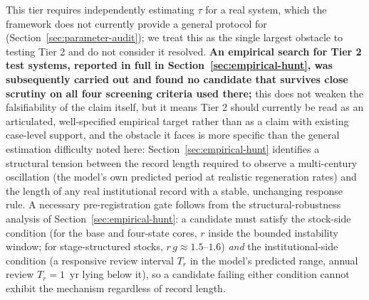 \documentclass[twocolumn,10pt]{article}
\begin{document}
This tier requires independently estimating $\tau$ for a real system, which the framework does not currently provide a general protocol for (Section~\ref{sec:parameter-audit}); we treat this as the single largest obstacle to testing Tier 2 and do not consider it resolved. \textbf{An empirical search for Tier 2 test systems, reported in full in Section~\ref{sec:empirical-hunt}, was subsequently carried out and found no candidate that survives close scrutiny on all four screening criteria used there;} this does not weaken the falsifiability of the claim itself, but it means Tier 2 should currently be read as an articulated, well-specified empirical target rather than as a claim with existing case-level support, and the obstacle it faces is more specific than the general estimation difficulty noted here: Section~\ref{sec:empirical-hunt} identifies a structural tension between the record length required to observe a multi-century oscillation (the model's own predicted period at realistic regeneration rates) and the length of any real institutional record with a stable, unchanging response rule. A necessary pre-registration gate follows from the structural-robustness analysis of Section~\ref{sec:empirical-hunt}: a candidate must satisfy the stock-side condition (for the base and four-state cores, $r$ inside the bounded instability window; for stage-structured stocks, $r\,g\approx1.5$--$1.6$) \emph{and} the institutional-side condition (a responsive review interval $T_r$ in the model's predicted range, annual review $T_r=1$~yr lying below it), so a candidate failing either condition cannot exhibit the mechanism regardless of record length.
\end{document}
